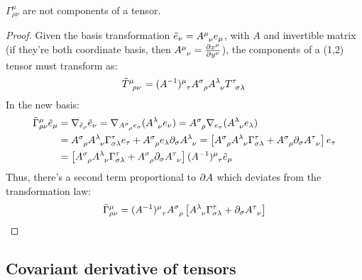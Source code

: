 \begin{proposition}\label{gamma-non-tens}
  $ \Gamma^\mu_{\rho \nu} $ are not components of a tensor.
\end{proposition}
\begin{proof}
  Given the basis transformation $ \tilde{e}_\nu = \tensor{A}{^\mu _\nu} e_\mu $, with $ A $ and invertible matrix (if they're both coordinate basis, then $ \tensor{A}{^\mu _\nu} = \frac{\pa x^\mu}{\pa y^\nu} $), the components of a (1,2) tensor must transform as:
  \begin{equation*}
    \tensor{\tilde{T}}{^\mu _\rho _\nu} = \tensor{(A^{-1})}{^\mu _\tau} \tensor{A}{^\sigma _\rho} \tensor{A}{^\lambda _\nu} \tensor{T}{^\tau _\sigma _\lambda}
  \end{equation*}
  In the new basis:
  \begin{equation*}
    \begin{split}
      \tilde{\Gamma}^\mu_{\rho \nu} \tilde{e}_\mu
      &= \na_{\tilde{e}_\rho}\tilde{e}_\nu = \na_{\tensor{A}{^\sigma _\rho} e_\sigma} (\tensor{A}{^\lambda _\nu} e_{\nu}) = \tensor{A}{^\sigma _\rho} \na_{e_\sigma} (\tensor{A}{^\lambda _\nu} e_\lambda) \\
      &= \tensor{A}{^\sigma _\rho} \tensor{A}{^\lambda _\nu} \Gamma^\tau_{\sigma \lambda} e_\tau + \tensor{A}{^\sigma _\rho} e_\lambda \pa_\sigma \tensor{A}{^\lambda _\nu} = \left[ \tensor{A}{^\sigma _\rho} \tensor{A}{^\lambda _\nu} \Gamma^\tau_{\sigma \lambda} + \tensor{A}{^\sigma _\rho} \pa_\sigma \tensor{A}{^\tau _\nu} \right] e_\tau \\
      &= \left[ \tensor{A}{^\sigma _\rho} \tensor{A}{^\lambda _\nu} \Gamma^\tau_{\sigma \lambda} + \tensor{A}{^\sigma _\rho} \pa_\sigma \tensor{A}{^\tau _\nu} \right] \tensor{(A^{-1})}{^\mu _\tau} \tilde{e}_\mu
    \end{split}
  \end{equation*}
  Thus, there's a second term proportional to $ \partial A $ which deviates from the transformation law:
  \begin{equation*}
    \tilde{\Gamma}^\mu_{\rho \nu} = \tensor{(A^{-1})}{^\mu _\tau} \tensor{A}{^\sigma _\rho} \left[ \tensor{A}{^\lambda _\nu} \Gamma^\tau_{\sigma \lambda} + \pa_\sigma \tensor{A}{^\tau _\nu} \right]
  \end{equation*}
\end{proof}

\subsection{Covariant derivative of tensors}

